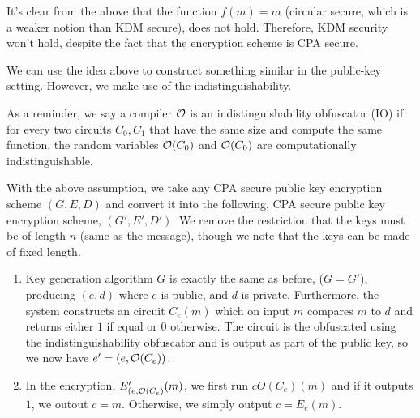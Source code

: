 \documentclass{article}
\begin{document}
\begin{enumerate}[,label=\alph*.]
It's clear from the above that the function $f(m) = m$ (circular secure, which is a weaker notion than
KDM secure), does not hold. Therefore, KDM security won't hold, despite the fact that the encryption
scheme is CPA secure.%

We can use the idea above to construct something similar in the public-key setting. However, 
we make use of the indistinguishability.%

As a reminder, we say a compiler $\mathcal{O}$ is an indistinguishability obfuscator (IO) if for every two 
circuits $C_0, C_1$ that have the same size and compute the same function, the random variables $\mathcal{O}(C_0)$
and $\mathcal{O}(C_0)$ are computationally indistinguishable.%

With the above assumption, we take any CPA secure public key encryption scheme $(G,E,D)$ and convert
it into the following, CPA secure public key encryption scheme, $(G',E',D')$. We remove the restriction
that the keys must be of length $n$ (same as the message), though we note that the keys can be made
of fixed length.%

\begin{enumerate}[noitemsep,topsep=\mdcompacttopsep]%

\item{}Key generation algorithm $G$ is exactly the same as before, ($G = G'$), producing $(e,d)$ where
$e$ is public, and $d$ is private. Furthermore, the system constructs an circuit $C_e(m)$ which on
input $m$ compares $m$ to $d$ and returns either $1$ if equal or $0$ otherwise. The circuit 
is the obfuscated using the indistinguishability obfuscator and is output as part of the public
key, so we now have $e' = (e,\mathcal{O}(C_e))$.%

\item{}In the encryption, $E'_{(e,\mathcal{O}(C_e)}(m)$, we first run $cO(C_e)(m)$ and if it outputs $1$, we outout
$c = m$. Otherwise, we simply output $c = E_e(m)$.%


\end{enumerate}
\end{enumerate}
\end{document}
